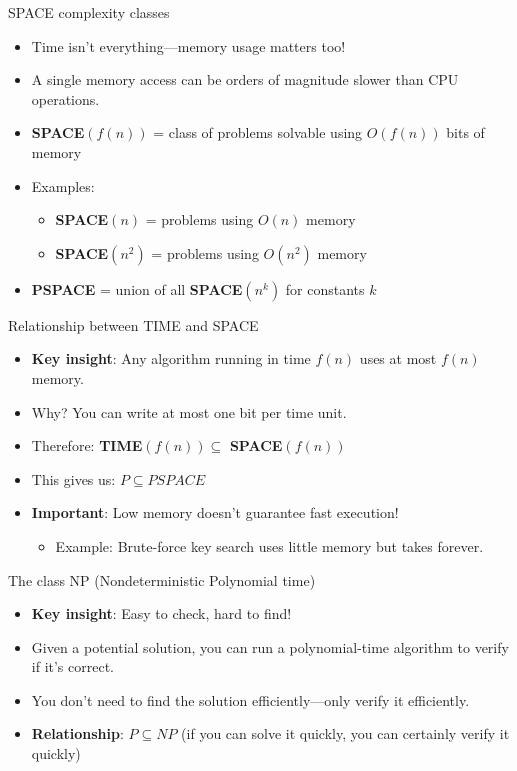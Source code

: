 \documentclass[aspectratio=169, lualatex, handout]{beamer}
\begin{document}
\begin{frame}{SPACE complexity classes}
	\begin{itemize}[<+->]
		\item Time isn't everything—memory usage matters too!
		\item A single memory access can be orders of magnitude slower than CPU operations.
		\item \textbf{SPACE}$(f(n))$ = class of problems solvable using $O(f(n))$ bits of memory
		\item Examples:
		      \begin{itemize}
			      \item \textbf{SPACE}$(n)$ = problems using $O(n)$ memory
			      \item \textbf{SPACE}$(n^2)$ = problems using $O(n^2)$ memory
		      \end{itemize}
		\item \textbf{PSPACE} = union of all \textbf{SPACE}$(n^k)$ for constants $k$
	\end{itemize}
\end{frame}

\begin{frame}{Relationship between TIME and SPACE}
	\begin{itemize}[<+->]
		\item \textbf{Key insight}: Any algorithm running in time $f(n)$ uses at most $f(n)$ memory.
		\item Why? You can write at most one bit per time unit.
		\item Therefore: \textbf{TIME}$(f(n)) \subseteq$ \textbf{SPACE}$(f(n))$
		\item This gives us: $P \subseteq PSPACE$
		\item \textbf{Important}: Low memory doesn't guarantee fast execution!
		      \begin{itemize}
			      \item Example: Brute-force key search uses little memory but takes forever.
		      \end{itemize}
	\end{itemize}
\end{frame}

\begin{frame}{The class NP (Nondeterministic Polynomial time)}
	\begin{itemize}[<+->]
		\item \textbf{Key insight}: Easy to check, hard to find!
		\item Given a potential solution, you can run a polynomial-time algorithm to verify if it's correct.
		\item You don't need to find the solution efficiently—only verify it efficiently.
		\item \textbf{Relationship}: $P \subseteq NP$ (if you can solve it quickly, you can certainly verify it quickly)
	\end{itemize}
\end{frame}
\end{document}
